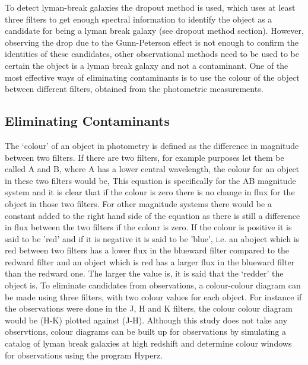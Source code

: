 To detect lyman-break galaxies the dropout method is used, which uses at least three filters to get enough spectral information to identify the object as a candidate for being a lyman break galaxy (see dropout method section). However,  observing the drop due to the Gunn-Peterson effect is not enough to confirm the identities of these candidates, other observational methods need to be used to be certain the object is a lyman break galaxy and not a contaminant. One of the most effective ways of eliminating contaminants is to use the colour of the object between different filters, obtained from the photometric measurements.

    
    \subsection{Eliminating Contaminants} %
    \label{sub:Eliminating_Contanimants}

 The ‘colour’ of an object in photometry is defined as the difference in magnitude between two filters.  If there are two filters, for example purposes let them be called A and B, where A has a lower central wavelength, the colour for an object in these two filters would be,
This equation is specifically for the AB magnitude system and it is clear that if the colour is zero there is no change in flux for the object in those two filters. For other magnitude systems there would be a constant added to the right hand side of the equation as there is still a difference in flux between the two filters if the colour is zero. If the colour is positive it is said to be 'red' and if it is negative it is said to be 'blue', i.e. an aboject which is red between two filters has a lower flux in the blueward filter compared to the redward filter and an object which is red has a larger flux in the blueward filter than the redward one.  The larger the value is, it is said that the ‘redder’ the object is. To eliminate candidates from observations, a colour-colour diagram can be made using three filters, with two colour values for each object. For instance if the observations were done in the J, H and K filters, the colour colour diagram would be (H-K) plotted against (J-H). Although this study does not take any observtions, colour diagrams can be built up for observations by simulating a catalog of lyman break galaxies at high redshift and determine colour windows for observations using the program Hyperz.

